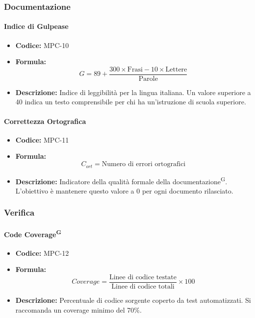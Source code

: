 \documentclass[a4paper, 11pt]{article}
\begin{document}
\subsubsection{Documentazione}

\paragraph{Indice di Gulpease}
\begin{itemize}
    \item \textbf{Codice:} MPC-10 
    \item \textbf{Formula:} $$G = 89 + \frac{300 \times \text{Frasi} - 10 \times \text{Lettere}}{\text{Parole}}$$
    \item \textbf{Descrizione:} Indice di leggibilità per la lingua italiana. Un valore superiore a 40 indica un testo comprensibile per chi ha un'istruzione di scuola superiore.
\end{itemize}

\paragraph{Correttezza Ortografica}
\begin{itemize}
    \item \textbf{Codice:} MPC-11 
    \item \textbf{Formula:} $$C_{ort} = \text{Numero di errori ortografici}$$
    \item \textbf{Descrizione:} Indicatore della qualità formale della documentazione\textsuperscript{G}. L'obiettivo è mantenere questo valore a 0 per ogni documento rilasciato.
\end{itemize}

\subsubsection{Verifica}

\paragraph{Code Coverage\textsuperscript{G}}
\begin{itemize}
    \item \textbf{Codice:} MPC-12 
    \item \textbf{Formula:} $$Coverage = \frac{\text{Linee di codice testate}}{\text{Linee di codice totali}} \times 100$$
    \item \textbf{Descrizione:} Percentuale di codice sorgente coperto da test automatizzati. Si raccomanda un coverage minimo del 70\%.
\end{itemize}
\end{document}
